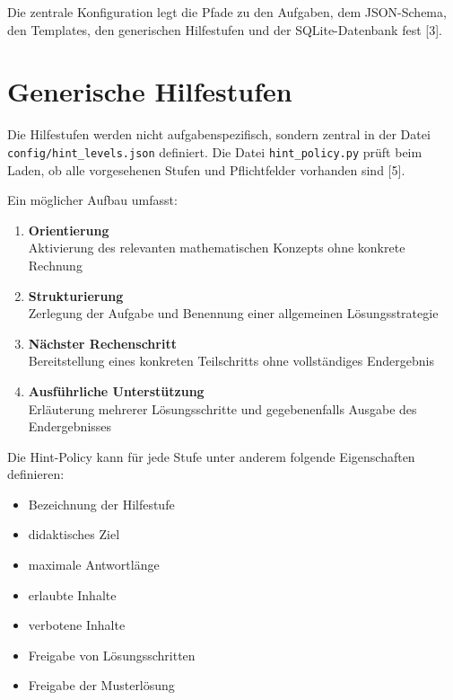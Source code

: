 \documentclass[11pt,a4paper,oneside,ngerman]{memoir}
\begin{document}
Die zentrale Konfiguration legt die Pfade zu den Aufgaben, dem JSON-Schema, den Templates, den generischen Hilfestufen und der SQLite-Datenbank fest [3].

\section{Generische Hilfestufen}

Die Hilfestufen werden nicht aufgabenspezifisch, sondern zentral in der Datei \texttt{config/hint\_levels.json} definiert. Die Datei \texttt{hint\_policy.py} prüft beim Laden, ob alle vorgesehenen Stufen und Pflichtfelder vorhanden sind [5].

Ein möglicher Aufbau umfasst:

\begin{enumerate}
    \item \textbf{Orientierung}\\
    Aktivierung des relevanten mathematischen Konzepts ohne konkrete Rechnung

    \item \textbf{Strukturierung}\\
    Zerlegung der Aufgabe und Benennung einer allgemeinen Lösungsstrategie

    \item \textbf{Nächster Rechenschritt}\\
    Bereitstellung eines konkreten Teilschritts ohne vollständiges Endergebnis

    \item \textbf{Ausführliche Unterstützung}\\
    Erläuterung mehrerer Lösungsschritte und gegebenenfalls Ausgabe des Endergebnisses
\end{enumerate}

Die Hint-Policy kann für jede Stufe unter anderem folgende Eigenschaften definieren:

\begin{itemize}
    \item Bezeichnung der Hilfestufe
    \item didaktisches Ziel
    \item maximale Antwortlänge
    \item erlaubte Inhalte
    \item verbotene Inhalte
    \item Freigabe von Lösungsschritten
    \item Freigabe der Musterlösung
\end{itemize}
\end{document}
